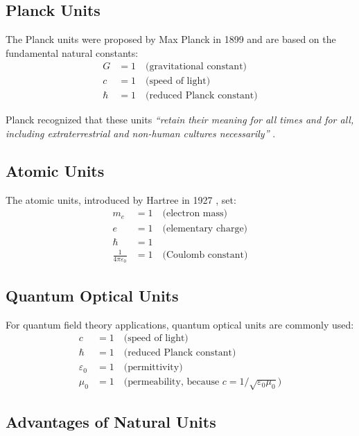 \documentclass[11pt,a4paper]{article}
\begin{document}
	\subsection{Planck Units}
	
	The Planck units were proposed by Max Planck in 1899 \cite{planck1900,planck1906} and are based on the fundamental natural constants:
	\begin{align}
		G &= 1 \quad \text{(gravitational constant)} \\
		c &= 1 \quad \text{(speed of light)} \\
		\hbar &= 1 \quad \text{(reduced Planck constant)}
	\end{align}
	
	Planck recognized that these units \textit{``retain their meaning for all times and for all, including extraterrestrial and non-human cultures necessarily''} \cite{planck1900}.
	
	\subsection{Atomic Units}
	
	The atomic units, introduced by Hartree in 1927 \cite{hartree1957}, set:
	\begin{align}
		m_e &= 1 \quad \text{(electron mass)} \\
		e &= 1 \quad \text{(elementary charge)} \\
		\hbar &= 1 \\
		\frac{1}{4\pi\varepsilon_0} &= 1 \quad \text{(Coulomb constant)}
	\end{align}
	
	\subsection{Quantum Optical Units}
	
	For quantum field theory applications, quantum optical units are commonly used:
	\begin{align}
		c &= 1 \quad \text{(speed of light)} \\
		\hbar &= 1 \quad \text{(reduced Planck constant)} \\
		\varepsilon_0 &= 1 \quad \text{(permittivity)} \\
		\mu_0 &= 1 \quad \text{(permeability, because } c = 1/\sqrt{\varepsilon_0 \mu_0}\text{)}
	\end{align}
	
	\subsection{Advantages of Natural Units}
	
\end{document}
